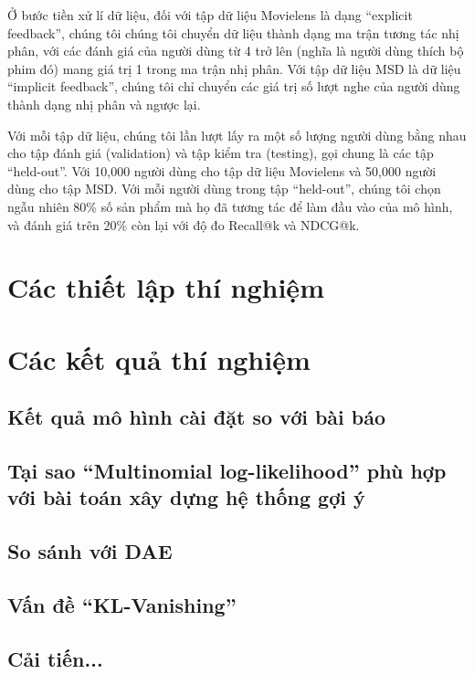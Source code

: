 Ở bước tiền xử lí dữ liệu, đối với tập dữ liệu Movielens là dạng ``explicit feedback'', chúng tôi 
chúng tôi chuyển dữ liệu thành dạng ma trận tương tác nhị phân, với các đánh giá của người dùng từ 4 trở lên (nghĩa là người dùng thích bộ phim đó) mang giá trị 1 trong ma trận nhị phân.
Với tập dữ liệu MSD là dữ liệu ``implicit feedback'', chúng tôi chỉ chuyển các giá trị số lượt nghe của người dùng thành dạng nhị phân và ngược lại.

Với mỗi tập dữ liệu, chúng tôi lần lượt lấy ra một số lượng người dùng bằng nhau cho tập đánh giá (validation) và tập kiểm tra (testing), gọi chung là các tập ``held-out''.
Với 10,000 người dùng cho tập dữ liệu Movielens và 50,000 người dùng cho tập MSD.
Với mỗi người dùng trong tập ``held-out'', chúng tôi chọn ngẫu nhiên 80\% số sản phẩm mà họ đã tương tác để làm đầu vào của mô hình, và đánh giá trên 20\% còn lại với 
độ đo Recall@k và NDCG@k.


\section{Các thiết lập thí nghiệm}
\section{Các kết quả thí nghiệm}
    \subsection{Kết quả mô hình cài đặt so với bài báo}
    \subsection{Tại sao ``Multinomial log-likelihood'' phù hợp với bài toán xây dựng hệ thống gợi ý}
    \subsection{So sánh với DAE}
    \subsection{Vấn đề ``KL-Vanishing''}
    \subsection{Cải tiến...}